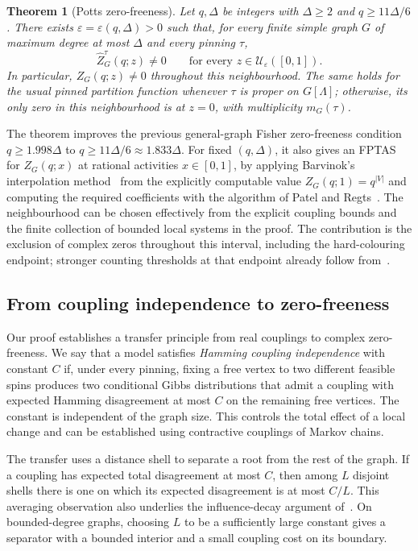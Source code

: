\documentclass[11pt,reqno]{article}
\theoremstyle{plain}
\newtheorem{theorem}{Theorem}[section]
\theoremstyle{definition}
\theoremstyle{remark}
\theoremstyle{definition}
\theoremstyle{remark}
\newcommand{\eps}{\varepsilon}
\newcommand{\Deg}{\Delta}                        %
\newcommand{\Zpart}{Z}                           %
\newcommand{\nZpin}[2]{\widehat Z_{#1}^{#2}}
\begin{document}
\begin{theorem}[Potts zero-freeness]
\label{thm:intro-main}
Let \(q,\Deg\) be integers with \(\Deg\ge2\) and \(q\ge11\Deg/6\).
There exists \(\eps=\eps(q,\Deg)>0\) such that, for every finite simple
graph \(G\) of maximum degree at most \(\Deg\) and every pinning \(\tau\),
\[
  \nZpin{G}{\tau}(q;z)\ne0
  \qquad\text{for every }z\in\mathcal U_\eps([0,1]).
\]
In particular, \(\Zpart_G(q;z)\ne0\) throughout this neighbourhood.
The same holds for the usual pinned partition function whenever
\(\tau\) is proper on \(G[\Lambda]\); otherwise, its only zero in this
neighbourhood is at \(z=0\), with multiplicity \(m_G(\tau)\).
\end{theorem}

The theorem improves the previous general-graph Fisher zero-freeness
condition \(q\ge1.998\Deg\) to \(q\ge11\Deg/6\approx1.833\Deg\).
For fixed \((q,\Deg)\), it also gives an FPTAS for
\(\Zpart_G(q;x)\) at rational activities \(x\in[0,1]\), by applying
Barvinok's interpolation method~\cite{Barvinok2016} from the explicitly
computable value \(\Zpart_G(q;1)=q^{|V|}\) and computing the required
coefficients with the algorithm of Patel and Regts~\cite{PatelRegts2017}.
The neighbourhood can be chosen effectively from the explicit coupling
bounds and the finite collection of bounded local systems in the proof.
The contribution is the exclusion of complex zeros throughout this
interval, including the hard-colouring endpoint; stronger counting
thresholds at that endpoint already follow from~\cite{CFFGZZ2024}.

\subsection{From coupling independence to zero-freeness}
\label{sec:intro-transfer}

Our proof establishes a transfer principle from real couplings to
complex zero-freeness.  We say that a model satisfies \emph{Hamming
coupling independence} with constant \(C\) if, under every pinning,
fixing a free vertex to two different feasible spins produces two
conditional Gibbs distributions that admit a coupling with expected
Hamming disagreement at most \(C\) on the remaining free vertices.
The constant is independent of the graph size.
This controls the total effect of a local change and can be established
using contractive couplings of Markov chains.

The transfer uses a distance shell to separate a root from the rest of
the graph.  If a coupling has expected total disagreement at most
\(C\), then among \(L\) disjoint shells there is one on which its
expected disagreement is at most \(C/L\).  This averaging observation
also underlies the influence-decay argument
of~\cite{CFFGZZ2024}.  On bounded-degree graphs, choosing \(L\) to be
a sufficiently large constant gives a separator with a bounded interior
and a small coupling cost on its boundary.
\end{document}
